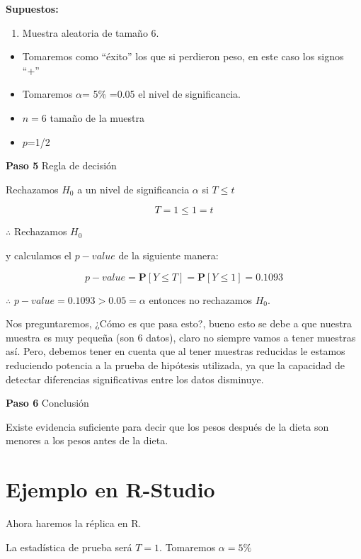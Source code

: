 \documentclass[
  a4paper,
  oneside,
  openany]{book}
\providecommand{\tightlist}{%
  \setlength{\itemsep}{0pt}\setlength{\parskip}{0pt}}
\begin{document}
\textbf{Supuestos:}

\begin{enumerate}
\def\labelenumi{\arabic{enumi}.}
\tightlist
\item
  Muestra aleatoria de tamaño 6.
\end{enumerate}

\begin{itemize}
\item
  Tomaremos como ``éxito'' los que si perdieron peso, en este caso los signos ``+''
\item
  Tomaremos \(\alpha\)= 5\% =0.05 el nivel de significancia.
\item
  \(n=6\) tamaño de la muestra
\item
  \(p\)=1/2
\end{itemize}

\textbf{Paso 5} Regla de decisión

Rechazamos \(H_0\) a un nivel de significancia \(\alpha\) si \(T \leq t\)

\[T=1 \leq 1=t\]

\(\therefore\) Rechazamos \(H_0\)

y calculamos el \(p-value\) de la siguiente manera:

\[p-value=\mathbf{P}[Y\leq T]=\mathbf{P}[Y\leq 1]=0.1093\]

\(\therefore\) \(p-value=0.1093>0.05=\alpha\) entonces no rechazamos \(H_0\).

Nos preguntaremos, ¿Cómo es que pasa esto?, bueno esto se debe a que nuestra muestra es muy pequeña (son 6 datos), claro no siempre vamos a tener muestras así. Pero, debemos tener en cuenta que al tener muestras reducidas le estamos reduciendo potencia a la prueba de hipótesis utilizada, ya que la capacidad de detectar diferencias significativas entre los datos disminuye.

\textbf{Paso 6} Conclusión

Existe evidencia suficiente para decir que los pesos después de la dieta son menores a los pesos antes de la dieta.

\hypertarget{ejemplo-en-r-studio-2}{%
\section{Ejemplo en R-Studio}\label{ejemplo-en-r-studio-2}}

Ahora haremos la réplica en R.

La estadística de prueba será \(T=1\). Tomaremos \(\alpha=5\%\)
\end{document}
